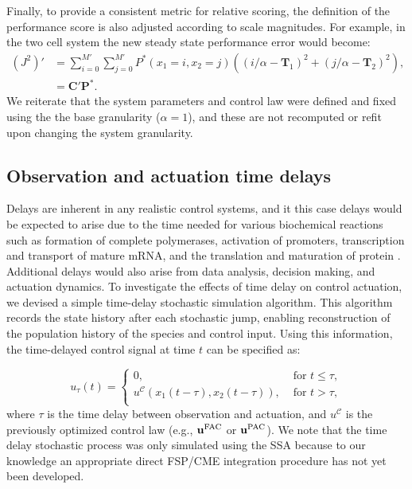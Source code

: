 \documentclass[12pt]{iopart}
\begin{document}
Finally, to provide a consistent metric for relative scoring, the definition of the performance score is also adjusted according to scale magnitudes. For example, in the two cell system the new steady state performance error would become:
\begin{eqnarray}
(J^2)' &= \sum_{i=0}^{M'}  \sum_{j=0}^{M'}P^*(x_1=i,x_2=j) ((i/\alpha - \mathbf T_1)^2 + (j/\alpha -\mathbf T_2)^2),\nonumber \\
& =\mathbf{C}'\mathbf{P}^*.
\label{EuclidV}
\end{eqnarray}
We reiterate that the system parameters and control law were defined and fixed using the the base granularity ($\alpha=1$), and these are not recomputed or refit upon changing the system granularity.

\subsection{Observation and actuation time delays}\label{sec:Delay}

Delays are inherent in any realistic control systems, and it this case delays would be expected to arise due to the time needed for various biochemical reactions such as formation of complete polymerases, activation of promoters, transcription and transport of mature mRNA, and the translation and maturation of protein \cite{Cai2007}. 
Additional delays would also arise from data analysis, decision making, and actuation dynamics. 
To investigate the effects of time delay on control actuation, we devised a simple time-delay stochastic simulation algorithm. 
This algorithm records the state history after each stochastic jump, enabling reconstruction of the population history of the species and control input.  
Using this information, the time-delayed control signal at time $t$ can be specified as: 

\begin{equation}
u_{\tau}(t)=\left\{
\begin{array}{rl}
      0 ,&\textrm{ for }  t \leq \tau, \\
      {u}^{\mathcal{C}}(x_1(t-\tau), x_2(t-\tau)) , &\textrm{ for }   t > \tau,\\
\end{array}\right. 
\label{timeDelaySSA}
\end{equation}
where $\tau$ is the time delay between observation and actuation, and ${u}^{\mathcal{C}}$ is the previously optimized control law (e.g., $\mathbf{u}^{\rm FAC}$ or $\mathbf{u}^{\rm PAC}$). 
We note that the time delay stochastic process was only simulated using the SSA because to our knowledge an appropriate direct FSP/CME integration procedure has not yet been developed.
\end{document}
